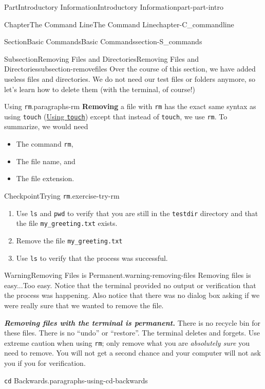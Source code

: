 \documentclass[oneside,10pt,]{book}
\newcommand{\mono}[1]{\texttt{#1}}
\newcommand{\alert}[1]{\textbf{\textit{#1}}}
\newcommand{\terminology}[1]{\textbf{#1}}
\begin{document}
\begin{partptx}{Part}{Introductory Information}{}{Introductory Information}{}{}{part-part-intro}
\begin{chapterptx}{Chapter}{The Command Line}{}{The Command Line}{}{}{chapter-C_commandline}
\begin{sectionptx}{Section}{Basic Commands}{}{Basic Commands}{}{}{section-S_commands}
\begin{subsectionptx}{Subsection}{Removing Files and Directories}{}{Removing Files and Directories}{}{}{subsection-removefiles}
%
Over the course of this section, we have added useless files and directories. We do not need our test files or folders anymore, so let's learn how to delete them (with the terminal, of course!)%
\begin{paragraphs}{Using \mono{rm}.}{paragraphs-rm}%
\index{\mono{rm}}%
%
\index{command line!\mono{rm}}%
\terminology{Removing} a file with \mono{rm} has the exact same syntax as using \mono{touch} (\hyperlink{paragraphs-touch}{Using \mono{touch}}) except that instead of \mono{touch}, we use \mono{rm}. To summarize, we would need%
\begin{itemize}[label=\textbullet]
\item{}The command \mono{rm},%
\item{}The file name, and%
\item{}The file extension.%
\end{itemize}
%
\begin{inlineexercise}{Checkpoint}{Trying \mono{rm}.}{exercise-try-rm}%
\begin{enumerate}[font=\bfseries,label=(\alph*),ref=\alph*]%
\item{}Use \mono{ls} and \mono{pwd} to verify that you are still in the \mono{testdir} directory and that the file \mono{my\_greeting.txt} exists.%
\item{}Remove the file \mono{my\_greeting.txt}%
\item{}Use \mono{ls} to verify that the process was successful.%
\end{enumerate}%
\end{inlineexercise}%
\begin{warning}{Warning}{Removing Files is Permanent.}{warning-removing-files}%
%
Removing files is easy...Too easy. Notice that the terminal provided no output or verification that the process was happening. Also notice that there was no dialog box asking if we were really sure that we wanted to remove the file.%
\par
\alert{Removing files with the terminal is permanent.} There is no recycle bin for these files. There is no ``undo'' or ``restore''. The terminal deletes and forgets. Use extreme caution when using \mono{rm}; only remove what you are \emph{absolutely sure} you need to remove. You will not get a second chance and your computer will not ask you if you for verification.%
\end{warning}
\end{paragraphs}%
\begin{paragraphs}{\mono{cd} Backwards.}{paragraphs-using-cd-backwards}%

\end{paragraphs}
\end{subsectionptx}
\end{sectionptx}
\end{chapterptx}
\end{partptx}
\end{document}
